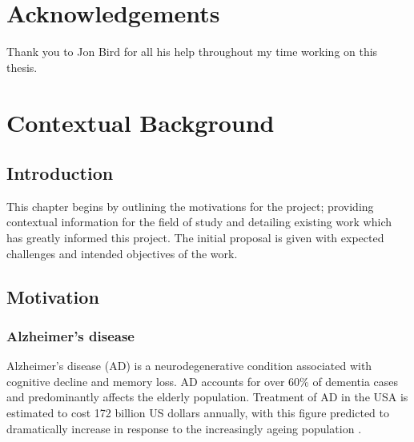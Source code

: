 \documentclass[
    author={Kai Hulme},
    supervisor={Dr Jon Bird},
    degree={BSc},
    title={Generative Adversarial Networks as an Augmentation Technique},
    subtitle={for Alzheimer's Disease Detection in MRI Volumes},
    type={Research},
    year={2021} 
]{dissertation}
\begin{document}
\begin{quote}
\begin{tabular}{lcl}
\end{tabular}
\end{quote}


\chapter*{Acknowledgements}

Thank you to Jon Bird for all his help throughout my time working on this thesis.


\mainmatter


\chapter{Contextual Background}
\label{chap:context}


\section{Introduction}

This chapter begins by outlining the motivations for the project; providing contextual information for the field of study and detailing existing work which has greatly informed this project. The initial proposal is given with expected challenges and intended objectives of the work.


\section{Motivation}

\subsection{Alzheimer's disease}

Alzheimer's disease (AD) is a neurodegenerative condition associated with cognitive decline and memory loss. AD  accounts for over 60\% of dementia cases and predominantly affects the elderly population. Treatment of AD in the USA is estimated to cost 172 billion US dollars annually, with this figure predicted to dramatically increase in response to the increasingly ageing population \cite{zheng2015new}.
\\
\end{document}
